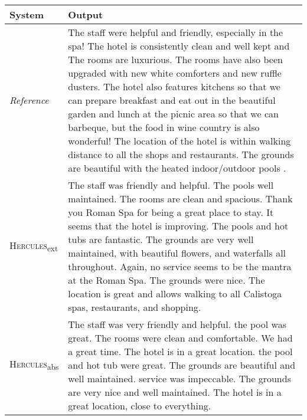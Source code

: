 \documentclass[11pt]{article}
\newcommand\Tstrut{\rule{0pt}{2.6ex}}         \newcommand\Bstrut{\rule[-1.6ex]{0pt}{0pt}}
\begin{document}
\begin{table*}[ht]
\renewcommand{\arraystretch}{1.2}
    \centering
    \small
    \begin{tabular}{@{}m{2cm}@{~}|@{~}m{13.5cm}@{}}
    \textbf{System} & \textbf{Output} \\
    \hline\hline


\textit{Reference}  &  \Tstrut The staff were helpful and friendly, especially in the spa! The hotel is consistently clean and well kept and The rooms are luxurious. The rooms have also been upgraded with new white comforters and new ruffle dusters. The hotel also features kitchens so that we can prepare breakfast and eat out in the beautiful garden and lunch at the picnic area so that we can barbeque, but the food in wine country is also wonderful! The location of the hotel is within walking distance to all the shops and restaurants. The grounds are beautiful with the heated indoor/outdoor pools .  \\ 
 \hline
\textsc{Hercules}\textsubscript{ext}  &  The staff was friendly and helpful. The pools well maintained. The rooms are clean and spacious. Thank you Roman Spa for being a great place to stay. It seems that the hotel is improving. The pools and hot tubs are fantastic. The grounds are very well maintained, with beautiful flowers, and waterfalls all throughout. Again, no service seems to be the mantra at the Roman Spa. The grounds were nice. The location is great and allows walking to all Calistoga spas, restaurants, and shopping.  \\ 
 \hline
\textsc{Hercules}\textsubscript{abs}  &  The staff was very friendly and helpful. the pool was great. The rooms were clean and comfortable. We had a great time. The hotel is in a great location. the pool and hot tub were great. The grounds are beautiful and well maintained. service was impeccable. The grounds are very nice and well maintained. The hotel is in a great location, close to everything. \Bstrut  \\

\hline\hline



\end{tabular}
\end{table*}
\end{document}
